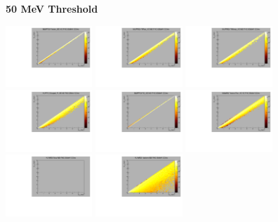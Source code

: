 \textbf{50 MeV Threshold}

\begin{center}

  \includegraphics[width=0.245\textwidth]{plots/response_matrix/Proton_KE_FHC_CCInc_50MeV.pdf}
  \includegraphics[width=0.245\textwidth]{plots/response_matrix/PiPlus_KE_FHC_CCInc_50MeV.pdf}
  \includegraphics[width=0.245\textwidth]{plots/response_matrix/PiMinus_KE_FHC_CCInc_50MeV.pdf}
  \includegraphics[width=0.245\textwidth]{plots/response_matrix/Charged_Pi_KE_FHC_CCInc_50MeV.pdf}
  \includegraphics[width=0.245\textwidth]{plots/response_matrix/Pi0_KE_FHC_CCInc_50MeV.pdf}
  \includegraphics[width=0.245\textwidth]{plots/response_matrix/Proton+Pion_KE_FHC_CCInc_50MeV.pdf}
  \includegraphics[width=0.245\textwidth]{plots/response_matrix/Total_FHC_CCInc_50MeV.pdf}
  \includegraphics[width=0.245\textwidth]{plots/response_matrix/Hadrons_FHC_CCInc_50MeV.pdf}

\end{center}

